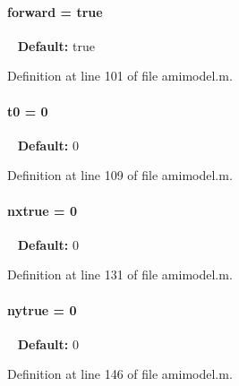 \hypertarget{classamimodel_a81e42e48c9c72814166c8f7cd414ce24}{}
\paragraph[{forward}]{\setlength{\rightskip}{0pt plus 5cm}forward = true}\label{classamimodel_a81e42e48c9c72814166c8f7cd414ce24}
~\newline
{\bfseries Default\+:} true 

Definition at line 101 of file amimodel.\+m.

\hypertarget{classamimodel_abdb5a42ffee3ca622484b53a322f1004}{}
\paragraph[{t0}]{\setlength{\rightskip}{0pt plus 5cm}t0 = 0}\label{classamimodel_abdb5a42ffee3ca622484b53a322f1004}
~\newline
{\bfseries Default\+:} 0 

Definition at line 109 of file amimodel.\+m.

\hypertarget{classamimodel_a49c476de14a021114feb8c95da04952a}{}
\paragraph[{nxtrue}]{\setlength{\rightskip}{0pt plus 5cm}nxtrue = 0}\label{classamimodel_a49c476de14a021114feb8c95da04952a}
~\newline
{\bfseries Default\+:} 0 

Definition at line 131 of file amimodel.\+m.

\hypertarget{classamimodel_ac91d7b36031ec122abc9f739692b02e8}{}
\paragraph[{nytrue}]{\setlength{\rightskip}{0pt plus 5cm}nytrue = 0}\label{classamimodel_ac91d7b36031ec122abc9f739692b02e8}
~\newline
{\bfseries Default\+:} 0 

Definition at line 146 of file amimodel.\+m.

\hypertarget{classamimodel_ad99abcd270ac97546c46292ebc6c2e0a}{}
